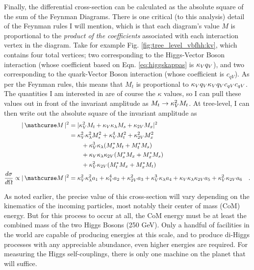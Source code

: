     Finally, the differential cross-section can be calculated as the absolute square of the sum of the Feynman Diagrams.
    There is one critical (to this analysis) detail of the Feynman rules I will mention,
        which is that each diagram's value $M$ is proportional to the \textit{product of the coefficients}
        associated with each interaction vertex in the diagram.
    Take for example Fig. \ref{fig:tree_level_vbfhh:kv}, which contains four total vertices;
        two corresponding to the Higgs-Vector Boson interaction (whose coefficient based on Eqn. \ref{eq:higgskappas} is $\kappa_{V} q_V$),
        and two corresponding to the quark-Vector Boson interaction (whose coefficient is $c_{qV}$).
    As per the Feynman rules, this means that $M_t$ is proportional to $\kappa_{V} q_V \kappa_{V} q_V c_{qV} c_{qV}$.
    The quantities I am interested in are of course the $\kappa$ values,
        so I can pull these values out in front of the invariant amplitude as $M_t \rightarrow \kappa_{V}^2 M_t$.
    At tree-level, I can then write out the absolute square of the invariant amplitude as
    \begin{equation} \begin{split} \label{eq:tree_level_invamp}
        |\invAmp|^2 &= |  \kv^2 M_t + \kv \kl M_s + \kvv M_x |^2
        \\&= \kv^2 \kl^2 M_s^2 + \kv^4 M_t^2 + \kvv^2 M_x^2 
            \\&\qquad + \kv^3 \kl (M_s^* M_t + M_t^* M_s) 
            \\&\qquad + \kv \kl \kvv (M_s^* M_x + M_x^* M_s ) 
            \\&\qquad + \kv^2 \kvv (M_t^* M_x + M_x^* M_t )
        \\\dXsec \propto |\invAmp|^2 &= \kv^2 \kl^2 a_1 + \kv^4 a_2 + \kvv^2 a_3 + \kv^3 \kl a_4 + \kv \kl \kvv a_5 + \kv^2 \kvv a_6
        \quad.
    \end{split} \end{equation}

    As noted earlier, the precise value of this cross-section will vary depending on the kinematics of the incoming particles,
        most notably their center of mass (CoM) energy.
    But for this process to occur at all, the CoM energy must be at least the combined mass of the two Higgs Bosons (250 GeV).
    Only a handful of facilities in the world are capable of producing energies at this scale,
        and to produce di-Higgs processes with any appreciable abundance,
        even higher energies are required.
    For measuring the Higgs self-couplings, there is only one machine on the planet that will suffice.
